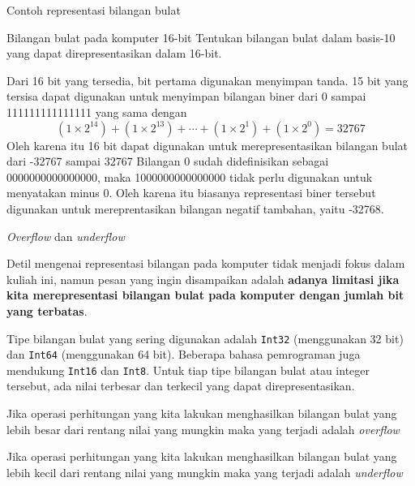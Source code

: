 \begin{frame}{Contoh representasi bilangan bulat}

\begin{block}{Bilangan bulat pada komputer 16-bit}
Tentukan bilangan bulat dalam basis-10 yang dapat direpresentasikan dalam 16-bit.
\end{block}

Dari 16 bit yang tersedia, bit pertama digunakan menyimpan tanda.
15 bit yang tersisa dapat digunakan untuk menyimpan bilangan biner
dari 0 sampai 111111111111111 yang sama dengan
$$
(1 \times 2^{14}) + (1 \times 2^{13}) + \cdots +
(1 \times 2^{1}) + (1 \times 2^{0}) = 32767
$$
Oleh karena itu 16 bit dapat digunakan untuk merepresentasikan bilangan bulat
dari -32767 sampai 32767
Bilangan 0 sudah didefinisikan sebagai 0000000000000000, maka
1000000000000000 tidak perlu digunakan untuk menyatakan minus 0. Oleh karena itu
biasanya representasi biner tersebut digunakan untuk mereprentasikan bilangan
negatif tambahan, yaitu -32768.

\end{frame}


\begin{frame}{\textit{Overflow} dan \textit{underflow}}

Detil mengenai representasi bilangan pada komputer tidak menjadi fokus dalam
kuliah ini, namun pesan yang ingin disampaikan adalah \textbf{adanya
limitasi jika kita merepresentasi bilangan bulat pada komputer dengan
jumlah bit yang terbatas}.

Tipe bilangan bulat yang sering digunakan adalah \texttt{Int32} (menggunakan
32 bit) dan \texttt{Int64} (menggunakan 64 bit). Beberapa bahasa pemrograman juga
mendukung \texttt{Int16} dan \texttt{Int8}.
Untuk tiap tipe bilangan bulat atau integer tersebut, ada nilai terbesar
dan terkecil yang dapat direpresentasikan.

Jika operasi perhitungan yang kita lakukan menghasilkan
bilangan bulat yang lebih besar dari rentang nilai yang mungkin
maka yang terjadi adalah \textit{overflow}

Jika operasi perhitungan yang kita lakukan menghasilkan
bilangan bulat yang lebih kecil dari rentang nilai yang mungkin
maka yang terjadi adalah \textit{underflow}

\end{frame}




